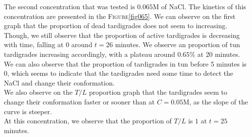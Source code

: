 \documentclass[12pt,a4paper, twocolumn]{article}
\begin{document}
The second concentration that was tested is $0.065$M of NaCl. The kinetics of this concentration are presented in the \textsc{Figure}\ref{fig065}. We can observe on the first graph that the proportion of dead tardigrades does not seem to increasing. Though, we still observe that the proportion of active tardigrades is decreasing with time, falling at $0$ around $t=26$ minutes. We observe an proportion of tun tardigrades increasing accordingly, with a plateau around $0.65\%$ at 20 minutes. We can also observe that the proportion of tardigrades in tun before 5 minutes is 0, which seems to indicate that the tardigrades need some time to detect the NaCl and change their conformation.\\
We also observe on the $T/L$ proportion graph that the tardigrades seem to change their conformation faster or sooner than at $C=0.05$M, as the slope of the curve is steeper.\\
At this concentration, we observe that the proportion of $T/L$ is $1$ at $t=25$ minutes.
\end{document}
